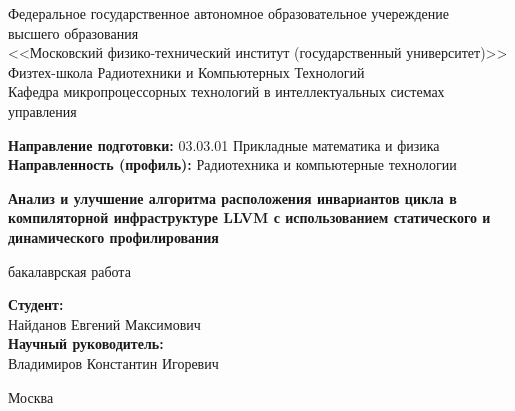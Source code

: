 \begin{center}
    Федеральное государственное автономное образовательное учереждение\\
    высшего образования\\
    <<Московский физико-технический институт (государственный университет)>> \\

    Физтех-школа Радиотехники и Компьютерных Технологий \\

    Кафедра микропроцессорных технологий в интеллектуальных системах управления\\

\end{center}

\vspace{1em}

\begin{flushleft}

    \textbf{Направление подготовки:} 03.03.01 Прикладные математика и физика\\
    \textbf{Направленность (профиль):} Радиотехника и компьютерные технологии\\

\end{flushleft}


\begin{center}
    \vspace{\fill}
    \Large{\textbf{Анализ и улучшение алгоритма расположения инвариантов цикла в компиляторной инфраструктуре LLVM с использованием статического и динамического профилирования}}

    \normalsize{бакалаврская работа}
    \vspace{\fill}
\end{center}


\begin{flushright}
    \textbf{Студент:}\\
    Найданов Евгений Максимович\\
    \vspace{2em}
    \textbf{Научный руководитель:} \\
    Владимиров Константин Игоревич \\
\end{flushright}

\vspace{7em}

\begin{center}
    Москва \the\year{}
\end{center}

\thispagestyle{empty}

\newpage
